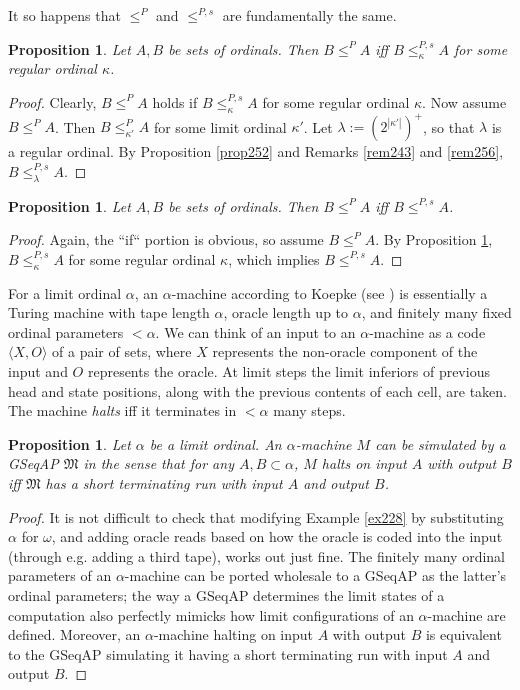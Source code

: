 \documentclass[12pt, twoside]{memoir}
\numberwithin{equation}{section}
\newtheorem{prop}[thm]{Proposition}
\theoremstyle{definition}
\theoremstyle{remark}
\theoremstyle{definition}
\theoremstyle{definition}
\theoremstyle{definition}
\theoremstyle{remark}
\begin{document}
It so happens that $\leq^P$ and $\leq^{P, s}$ are fundamentally the same.

\begin{prop}\label{prop271}
Let $A, B$ be sets of ordinals. Then $B \leq^P A$ iff $B \leq^{P, s}_{\kappa} A$ for some regular ordinal $\kappa$.
\end{prop}

\begin{proof}
Clearly, $B \leq^P A$ holds if $B \leq^{P, s}_{\kappa} A$ for some regular ordinal $\kappa$. Now assume $B \leq^P A$. Then $B \leq^P_{\kappa'} A$ for some limit ordinal $\kappa'$. Let $\lambda := (2^{|\kappa'|})^+$, so that $\lambda$ is a regular ordinal. By Proposition \ref{prop252} and Remarks \ref{rem243} and \ref{rem256}, $B \leq^{P, s}_{\lambda} A$.
\end{proof}

\begin{prop}
Let $A, B$ be sets of ordinals. Then $B \leq^P A$ iff $B \leq^{P, s} A$.
\end{prop}

\begin{proof}
Again, the ``if`` portion is obvious, so assume $B \leq^P A$. By Proposition \ref{prop271}, $B \leq^{P, s}_{\kappa} A$ for some regular ordinal $\kappa$, which implies $B \leq^{P, s} A$.
\end{proof}

For a limit ordinal $\alpha$, an $\alpha$-machine according to Koepke (see \cite{koepke2}) is essentially a Turing machine with tape length $\alpha$, oracle length up to $\alpha$, and finitely many fixed ordinal parameters $< \alpha$. We can think of an input to an $\alpha$-machine as a code $\langle X, O \rangle$ of a pair of sets, where $X$ represents the non-oracle component of the input and $O$ represents the oracle. At limit steps the limit inferiors of previous head and state positions, along with the previous contents of each cell, are taken. The machine \emph{halts} iff it terminates in $< \alpha$ many steps.

\begin{prop}\label{prop270}
Let $\alpha$ be a limit ordinal. An $\alpha$-machine $M$ can be simulated by a GSeqAP $\mathfrak{M}$ in the sense that for any $A, B \subset \alpha$, $M$ halts on input $A$ with output $B$ iff $\mathfrak{M}$ has a short terminating run with input $A$ and output $B$.
\end{prop}

\begin{proof}
It is not difficult to check that modifying Example \ref{ex228} by substituting $\alpha$ for $\omega$, and adding oracle reads based on how the oracle is coded into the input (through e.g. adding a third tape), works out just fine. The finitely many ordinal parameters of an $\alpha$-machine can be ported wholesale to a GSeqAP as the latter's ordinal parameters; the way a GSeqAP determines the limit states of a computation also perfectly mimicks how limit configurations of an $\alpha$-machine are defined. Moreover, an $\alpha$-machine halting on input $A$ with output $B$ is equivalent to the GSeqAP simulating it having a short terminating run with input $A$ and output $B$.
\end{proof}
\end{document}
